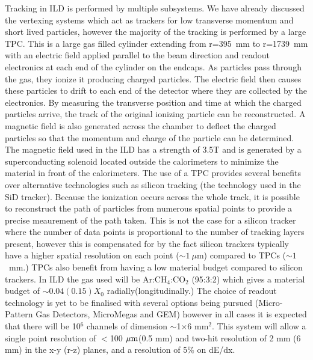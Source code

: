 Tracking in \ac{ILD} is performed by multiple subsystems. We have already discussed the vertexing systems which act as trackers for low transverse momentum and short lived particles, however the majority of the tracking is performed by a large \ac{TPC}.  This is a large gas filled cylinder extending from r=395~mm to r=1739~mm with an electric field applied parallel to the beam direction and readout electronics at each end of the cylinder on the endcaps. As particles pass through the gas, they ionize it producing charged particles. The electric field then causes these particles to drift to each end of the detector where they are collected by the electronics. By measuring the transverse position and time at which the charged particles arrive, the track of the original ionizing particle can be reconstructed. A magnetic field is also generated across the chamber to deflect the charged particles so that the momentum and charge of the particle can be determined. The magnetic field used in the ILD has a strength of 3.5T and is generated by a superconducting solenoid located outside the calorimeters to minimize the material in front of the calorimeters. The use of a \ac{TPC} provides several benefits over alternative technologies such as silicon tracking (the technology used in the \ac{SiD} tracker). Because the ionization occurs across the whole track, it is possible to reconstruct the path of particles from numerous spatial points to provide a precise meaurement of the path taken. This is not the case for a silicon tracker where the number of data points is proportional to the number of tracking layers present, however this is compensated for by the fact silicon trackers typically have a higher spatial resolution on each point ($\sim 1~\mu$m) compared to TPCs ($\sim 1$~mm.) TPCs also benefit from having a low material budget compared to silicon trackers. In \ac{ILD} the gas used will be Ar:CH$_{4}$:CO$_{2}$ (95:3:2) which gives a material budget of $\sim 0.04(0.15)X_0$ radially(longitudinally.) The choice of readout technology is yet to be finalised with several options being pursued (Micro-Pattern Gas Detectors, MicroMegas\cite{Giomataris:1995fq} and GEM\cite{Sauli:1997qp}) however in all cases it is expected that there will be 10${^{6}}$ channels of dimension $\sim$1$\times$6 mm$^{2}$. This system will allow a single point resolution of $<$100$~\mu\textrm{m}$(0.5 mm) and two-hit resolution of 2 mm (6 mm)  in the x-y (r-z) planes, and a resolution of 5$\%$ on dE/dx.

